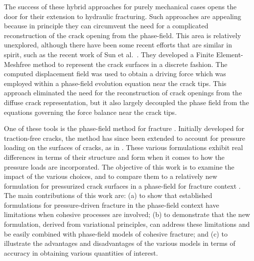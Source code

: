     The success of these hybrid approaches for purely mechanical cases opens the door for their extension to hydraulic fracturing.  Such approaches are appealing because in principle they can circumvent the need for a complicated reconstruction of the crack opening from the phase-field.  This area is relatively unexplored, although there have been some recent efforts that are similar in spirit, such as the recent work of Sun et al.\ \cite{sun2020hybrid}.  They developed a Finite Element-Meshfree method to represent the crack surfaces in a discrete fashion. The computed displacement field was used to obtain a driving force which was employed within a phase-field evolution equation near the crack tips. This approach eliminated the need for the reconstruction of crack openings from the diffuse crack representation, but it also largely decoupled the phase field from the equations governing the force balance near the crack tips. 










One of these tools is the phase-field method for fracture \cite{bourdin2000numerical}. Initially developed for traction-free cracks, the method has since been extended to account for pressure loading on the surfaces of cracks, as in \cite{bourdin2012variational, wheeler2014augmented, mikelic2015quasi, peco2017influence, jiang2022phase}.  These various formulations exhibit real differences in terms of their structure and form when it comes to how the pressure loads are incorporated.  
The objective of this work is to examine the impact of the various choices, and to compare them to 
a relatively new formulation for pressurized crack surfaces in a phase-field for fracture context \cite{hu2021variationalthesis}.  
The main contributions of this work are: (a) to show that established formulations for pressure-driven fracture in the phase-field
context have limitations when cohesive processes are involved; (b) to demonstrate that the new formulation, derived from variational principles, can address these limitations and be easily combined with phase-field models of cohesive fracture; and (c) to illustrate the advantages and disadvantages of the various models in terms of accuracy in obtaining various quantities of interest.  

